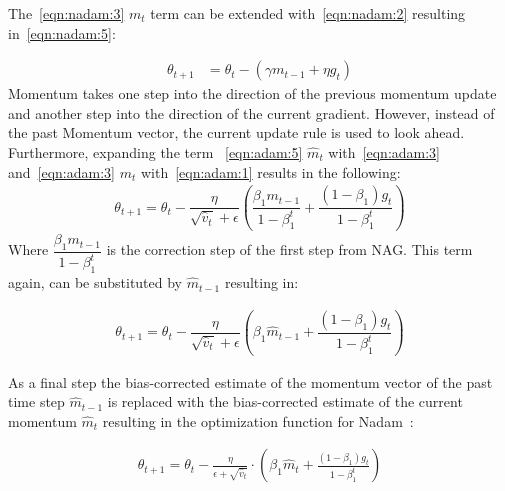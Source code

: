 The~\ref{eqn:nadam:3} $m_t$ term can be extended with~\ref{eqn:nadam:2} resulting in~\ref{eqn:nadam:5}:

\begin{align}
\theta_{t+1} &= \theta_t - (\gamma m_{t-1} + \eta g_t) \label{eqn:nadam:5}
\end{align}
Momentum takes one step into the direction of the previous momentum update and another step into the direction of the current
gradient.
However, instead of the past Momentum vector, the current update rule is used to look ahead.
Furthermore, expanding the term ~\ref{eqn:adam:5} $\hat{m}_t$ with~\ref{eqn:adam:3} and~\ref{eqn:adam:3} $m_t$ with~\ref{eqn:adam:1}
results in the following:
\begin{align}
 \theta_{t+1} = \theta_{t} - \dfrac{\eta}{\sqrt{\hat{v}_t} + \epsilon} (\dfrac{\beta_1 m_{t-1}}{1 - \beta^t_1} + \dfrac{(1 - \beta_1) g_t}{1 - \beta^t_1})
 \label{eqn:nadam:6}
\end{align}
Where $\dfrac{\beta_1 m_{t-1}}{1 - \beta^t_1}$ is the correction step of the first step from NAG.
This term again, can be substituted by $\hat{m}_{t-1}$ resulting in:

\begin{align}
    \theta_{t+1} = \theta_{t} - \dfrac{\eta}{\sqrt{\hat{v}_t} + \epsilon} (\beta_1 \hat{m}_{t-1} + \dfrac{(1 - \beta_1) g_t}{1 - \beta^t_1})
    \label{eqn:nadam:7}
\end{align}

As a final step the bias-corrected estimate of the momentum vector of the past time step $\hat{m}_{t-1}$ is replaced
with the bias-corrected estimate of the current momentum $\hat{m}_{t}$ resulting in the optimization function for Nadam~\cite{optimizersoverview}:



\begin{align}
    \theta_{t+1} = \theta_{t} - \frac{\eta}{\epsilon+\sqrt{\hat{v}_t}} \cdot (\beta_1\hat{m}_t+\frac{(1-\beta_1)g_t}{1-\beta_1^t}) \label{eqn:nadam:8}
\end{align}
\\ \par



